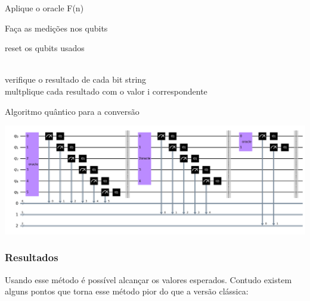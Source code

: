 \documentclass{article}
\begin{document}
\begin{algorithm}
	\begin{algorithmic}
		
			Aplique o oracle F(n)
			
			Faça as medições nos qubits
			
			reset os qubits usados
			
		\EndFor\\
		
		verifique o resultado de cada bit string\\
		
		multplique cada resultado com o valor i correspondente
		
	\end{algorithmic}
	\caption{Algoritmo quântico para a conversão}
	\label{alg:miles-to-km-quantum-algortihm}
\end{algorithm}

\begin{center}
	\includegraphics[scale=0.15]{number_breakdown_circuit.png}
	\label{fig:miles-km-circuit}
\end{center}

\subsubsection{Resultados}

Usando esse método é possível alcançar os valores esperados. Contudo existem alguns pontos que torna esse método pior do que a versão clássica:
\end{document}
